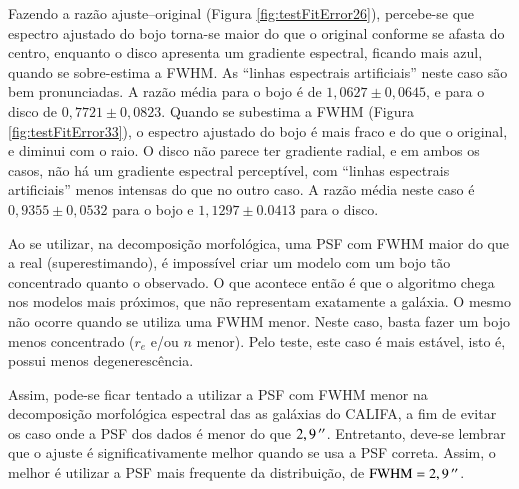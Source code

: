 Fazendo a razão ajuste--original (Figura \ref{fig:testFitError26}), percebe-se
que espectro ajustado do bojo torna-se maior do que o original conforme se
afasta do centro, enquanto o disco apresenta um gradiente espectral, ficando
mais azul, quando se sobre-estima a FWHM. As ``linhas espectrais artificiais''
neste caso são bem pronunciadas. A razão média para o bojo é de $1,0627 \pm
0,0645$, e para o disco de $0,7721 \pm 0,0823$. Quando se subestima a FWHM
(Figura \ref{fig:testFitError33}), o espectro ajustado do bojo é mais fraco e do
que o original, e diminui com o raio. O disco não parece ter gradiente radial, e
em ambos os casos, não há um gradiente espectral perceptível, com ``linhas
espectrais artificiais'' menos intensas do que no outro caso. A razão média
neste caso é $0,9355 \pm 0,0532$ para o bojo e $1,1297 \pm 0.0413$ para o disco.

Ao se utilizar, na decomposição morfológica, uma PSF com FWHM maior do que a
real (superestimando), é impossível criar um modelo com um bojo tão concentrado
quanto o observado. O que acontece então é que o algoritmo chega nos modelos
mais próximos, que não representam exatamente a galáxia. O mesmo não ocorre
quando se utiliza uma FWHM menor. Neste caso, basta fazer um bojo menos
concentrado ($r_e$ e/ou $n$ menor). Pelo teste, este caso é mais estável, isto
é, possui menos degenerescência.

Assim, pode-se ficar tentado a utilizar a PSF com FWHM menor na decomposição
morfológica espectral das as galáxias do CALIFA, a fim de evitar os caso onde a
PSF dos dados é menor do que $2,9\,^{\prime\prime}$. Entretanto, deve-se lembrar que o
ajuste é significativamente melhor quando se usa a PSF correta. Assim, o melhor
é utilizar a PSF mais frequente da distribuição, de $\mathrm{FWHM} =
2,9\,^{\prime\prime}$.


